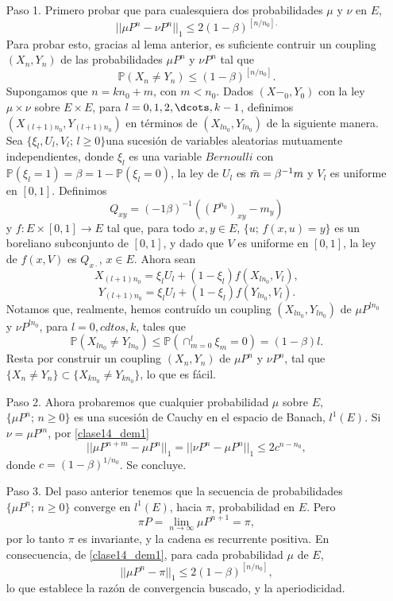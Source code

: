 \documentclass[a4paper]{article}
\newcommand{\prob}{\mathbb{P}}
\numberwithin{equation}{subsection}
\numberwithin{definicion}{subsection}
\begin{document}
\begin{itemize}
    \item[Paso 1.] Primero probar que para cualesquiera dos probabilidades $\mu$ y $\nu$ en $E$,
    \begin{equation}
        ||\mu P^n - \nu P^n||_1 \leq 2(1-\beta)^{[n/n_0].}
        \label{clase14_dem1}
    \end{equation}
    Para probar esto, gracias al lema anterior, es suficiente contruir un coupling $(X_n,Y_n)$ de las probabilidades $\mu P^n$ y $\nu P^n$ tal que
    \[\prob(X_n \neq Y_n) \leq (1-\beta)^{[n/n_0]}.\]
    Supongamos que  $n = kn_0 + m$, con $m<n_0$. Dados $(X-_0,Y_0)$ con la ley $\mu \times \nu$ sobre $E\times E$, para $l = 0,1,2,\dcots,k-1$, definimos $(X_{(l+1)n_0},Y_{(l+1)n_0})$ en términos de $(X_{ln_0},Y_{ln_0})$ de la siguiente manera. Sea $\{\xi_l , U_l, V_l;\,l\geq 0\}$una sucesión de variables aleatorias mutuamente independientes, donde $\xi_l$ es una variable $Bernoulli$ con $\prob(\xi_l = 1)=\beta = 1 -\prob(\xi_l = 0)$, la ley de $U_l$ es $\Bar{m} = \beta^{-1}m$ y $V_l$ es uniforme en $[0,1]$. Definimos
    \[Q_{xy} = (-1\beta)^{-1}((P^{n_0})_{xy}-m_y)\]
    y $f:E\times [0,1] \rightarrow E$ tal que, para todo $x,y\in E$, $\{u;\,f(x,u)=y\}$ es un boreliano subconjunto de $[0,1]$, y dado que $V$ es uniforme en $[0,1]$, la ley de $f(x,V)$ es $Q_{x\cdot}$, $x\in E$. Ahora sean
    \[X_{(l+1)n_0} = \xi_l U_l + (1-\xi_l)f(X_{ln_0},V_l),\]
    \[Y_{(l+1)n_0} = \xi_l U_l + (1-\xi_l)f(Y_{ln_0},V_l).\]
    Notamos que, realmente, hemos contruído un coupling $(X_{ln_0},Y_{ln_0})$ de $\mu P^{ln_0}$ y $\nu P^{ln_0}$, para $l=0,cdtos,k$, tales que
    \[\prob(X_{ln_0} \neq Y_{ln_0}) \leq  \prob(\cap_{m=0}^l \xi_m =0) = (1-\beta)l.\]
    Resta por construir un coupling $(X_n,Y_n)$ de $\mu P^n$ y $\nu P^n$, tal que $\{X_n \neq Y_n\} \subset \{X_{kn_0} \neq Y_{kn_0}\}$, lo  que es fácil.
    \item[Paso 2.] Ahora probaremos que cualquier probabilidad $\mu$ sobre $E$, $\{\mu P^n;\,n\geq 0\}$ es una sucesión de Cauchy en el espacio de Banach, $l^1(E)$. Si $\nu = \mu P^m$, por \ref{clase14_dem1} 
    \[||\mu P^{n+m}-\mu P^n||_1 = ||\nu P^n - \mu P^n||_1 \leq 2c^{n-n_0},\]
    donde $c=(1-\beta)^{1/n_0}$. Se concluye.
    \item[Paso 3.] Del paso anterior tenemos que la secuencia de probabilidades $\{\mu P^n;\,n\geq 0\}$ converge en $l^1(E)$, hacia $\pi$, probabilidad en $E$. Pero
    \[\pi P = \lim_{n\rightarrow \infty}\mu P^{n+1} = \pi,\]
    por lo tanto $\pi$ es invariante, y la cadena es recurrente positiva. En consecuencia, de \ref{clase14_dem1}, para cada probabilidad $\mu$ de $E$,
    \[||\mu P^n - \pi||_1 \leq 2(1-\beta)^{[n/n_0]},\]
    lo que establece la razón de convergencia buscado, y la aperiodicidad.
\end{itemize}
\end{document}
